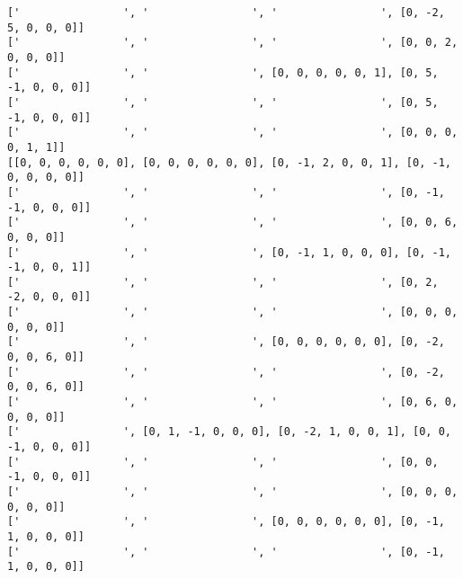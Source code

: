 \documentclass[10pt]{article}
\theoremstyle{plain}
\theoremstyle{definition}
\theoremstyle{remark}
\begin{document}
\begin{minipage}[t]{9cm}
\begin{verbatim}
['                ', '                ', '                ', [0, -2, 5, 0, 0, 0]]
['                ', '                ', '                ', [0, 0, 2, 0, 0, 0]]
['                ', '                ', [0, 0, 0, 0, 0, 1], [0, 5, -1, 0, 0, 0]]
['                ', '                ', '                ', [0, 5, -1, 0, 0, 0]]
['                ', '                ', '                ', [0, 0, 0, 0, 1, 1]]
[[0, 0, 0, 0, 0, 0], [0, 0, 0, 0, 0, 0], [0, -1, 2, 0, 0, 1], [0, -1, 0, 0, 0, 0]]
['                ', '                ', '                ', [0, -1, -1, 0, 0, 0]]
['                ', '                ', '                ', [0, 0, 6, 0, 0, 0]]
['                ', '                ', [0, -1, 1, 0, 0, 0], [0, -1, -1, 0, 0, 1]]
['                ', '                ', '                ', [0, 2, -2, 0, 0, 0]]
['                ', '                ', '                ', [0, 0, 0, 0, 0, 0]]
['                ', '                ', [0, 0, 0, 0, 0, 0], [0, -2, 0, 0, 6, 0]]
['                ', '                ', '                ', [0, -2, 0, 0, 6, 0]]
['                ', '                ', '                ', [0, 6, 0, 0, 0, 0]]
['                ', [0, 1, -1, 0, 0, 0], [0, -2, 1, 0, 0, 1], [0, 0, -1, 0, 0, 0]]
['                ', '                ', '                ', [0, 0, -1, 0, 0, 0]]
['                ', '                ', '                ', [0, 0, 0, 0, 0, 0]]
['                ', '                ', [0, 0, 0, 0, 0, 0], [0, -1, 1, 0, 0, 0]]
['                ', '                ', '                ', [0, -1, 1, 0, 0, 0]]
\end{verbatim}
\end{minipage}
\end{document}
